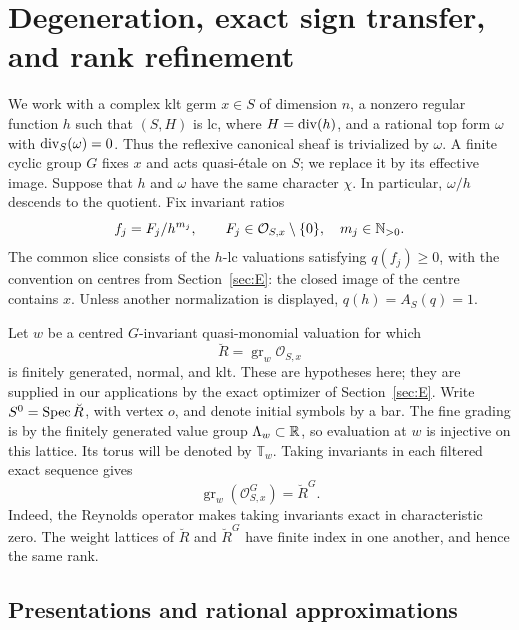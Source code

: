 \section{Degeneration, exact sign transfer, and rank refinement}\label{sec:F}

We work with a complex klt germ $x\in S$ of dimension $n$, a nonzero
regular function $h$ such that $(S,H)$ is lc, where $H=\operatorname{div}(h)$,
and a rational top form $\omega$ with $\operatorname{div}_S(\omega)=0$.
Thus the reflexive canonical sheaf is trivialized by $\omega$.
A finite cyclic group $G$ fixes $x$ and acts quasi-\'{e}tale on $S$;
we replace it by its effective image.  Suppose that $h$ and $\omega$
have the same character $\chi$.  In particular, $\omega/h$ descends
to the quotient.  Fix invariant ratios
\[
 f_j=F_j/h^{m_j},\qquad F_j\in\mathcal O_{S,x}\setminus\{0\},
 \quad m_j\in\mathbb N_{>0}.
\]
The common slice consists of the $h$-lc valuations satisfying
$q(f_j)\ge0$, with the convention on centres from Section~\ref{sec:E}:
the closed image of the centre contains $x$.  Unless another
normalization is displayed, $q(h)=A_S(q)=1$.

Let $w$ be a centred $G$-invariant quasi-monomial valuation for which
\[
 \breve R=\operatorname{gr}_w\mathcal O_{S,x}
\]
is finitely generated, normal, and klt.  These are hypotheses here;
they are supplied in our applications by the exact optimizer of
Section~\ref{sec:E}.  Write $S^0=\operatorname{Spec}\breve R$, with vertex $o$,
and denote initial symbols by a bar.  The fine grading is by the
finitely generated value group $\Lambda_w\subset\mathbb R$, so evaluation
at $w$ is injective on this lattice.  Its torus will be denoted by
$\mathbb T_w$.  Taking invariants in each filtered exact sequence gives
\begin{equation}\label{eq:F-invariant-graded}
 \operatorname{gr}_w(\mathcal O_{S,x}^{G})=\breve R^{G}.
\end{equation}
Indeed, the Reynolds operator makes taking invariants exact in
characteristic zero.  The weight lattices of $\breve R$ and
$\breve R^G$ have finite index in one another, and hence the same rank.

\subsection{Presentations and rational approximations}

